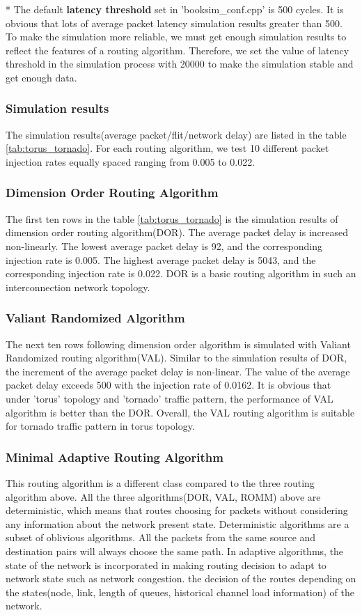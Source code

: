 * The default \textbf{latency threshold} set in 'booksim\_conf.cpp' is 500 cycles. It is obvious that lots of average packet latency simulation results greater than 500. To make the simulation more reliable, we must get enough simulation results to reflect the features of a routing algorithm. Therefore, we set the value of latency threshold in the simulation process with 20000 to make the simulation stable and get enough data.
\subsubsection{Simulation results}

The simulation results(average packet/flit/network delay) are listed in the table \ref{tab:torus_tornado}. For each routing algorithm, we test 10 different packet injection rates equally spaced ranging from 0.005 to 0.022.


\subsubsection{Dimension Order Routing Algorithm}
The first ten rows in the table \ref{tab:torus_tornado} is the simulation results of dimension order routing algorithm(DOR). The average packet delay is increased non-linearly. The lowest average packet delay is 92, and the corresponding injection rate is 0.005. The highest average packet delay is 5043, and the corresponding injection rate is 0.022. DOR is a basic routing algorithm in such an interconnection network topology.

\subsubsection{Valiant Randomized Algorithm}
The next ten rows following dimension order algorithm is simulated with Valiant Randomized routing algorithm(VAL). Similar to the simulation results of DOR, the increment of the average packet delay is non-linear. The value of the average packet delay exceeds 500 with the injection rate of 0.0162. It is obvious that under 'torus' topology and 'tornado' traffic pattern, the performance of VAL algorithm is better than the DOR. Overall, the VAL routing algorithm is suitable for tornado traffic pattern in torus topology.

\subsubsection{Minimal Adaptive Routing Algorithm}
This routing algorithm is a different class compared to the three routing algorithm above. All the three algorithms(DOR, VAL, ROMM) above are deterministic, which means that routes choosing for packets without considering any information about the network present state. Deterministic algorithms are a subset of oblivious algorithms. All the packets from the same source and destination pairs will always choose the same path. In adaptive algorithms, the state of the network is incorporated in making routing decision to adapt to network state such as network congestion. the decision of the routes depending on the states(node, link, length of queues, historical channel load information) of the network.

